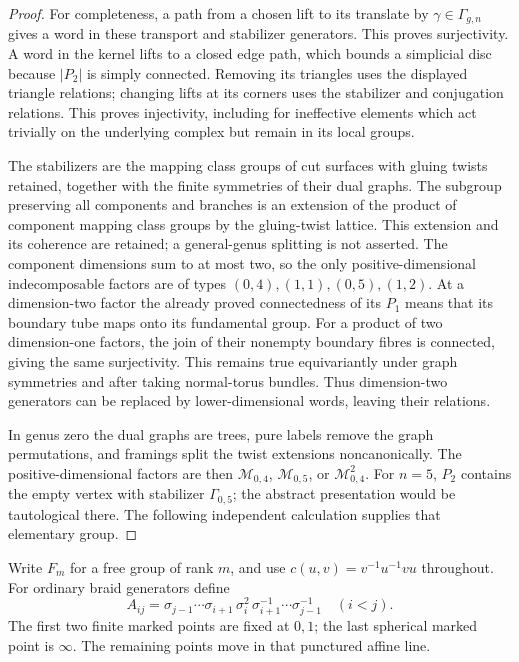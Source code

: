 \begin{proof}
For completeness, a path from a chosen lift to its
translate by \(\gamma\in\Gamma_{g,n}\) gives a word in
these transport and stabilizer generators. This proves
surjectivity. A word in the kernel lifts to a closed
edge path, which bounds a simplicial disc because
\(|P_2|\) is simply connected. Removing its triangles
uses the displayed triangle relations; changing lifts
at its corners uses the stabilizer and conjugation
relations. This proves injectivity, including for
ineffective elements which act trivially on the
underlying complex but remain in its local groups.

The stabilizers are the mapping class groups of cut
surfaces with gluing twists retained, together with
the finite symmetries of their dual graphs.
The subgroup preserving all components and branches
is an extension of the product of component mapping
class groups by the gluing-twist lattice.
This extension and its coherence are retained; a
general-genus splitting is not asserted.
The component dimensions sum to at most two, so the
only positive-dimensional indecomposable factors
are of types \((0,4),(1,1),(0,5),(1,2)\).
At a dimension-two factor the already proved
connectedness of its \(P_1\) means that its boundary
tube maps onto its fundamental group. For a product
of two dimension-one factors, the join of their
nonempty boundary fibres is connected, giving the
same surjectivity. This remains true equivariantly
under graph symmetries and after taking normal-torus
bundles. Thus dimension-two generators can be replaced
by lower-dimensional words, leaving their relations.

In genus zero the dual graphs are trees, pure labels
remove the graph permutations, and framings split the
twist extensions noncanonically. The positive-dimensional
factors are then \(\mathcal M_{0,4}\),
\(\mathcal M_{0,5}\), or \(\mathcal M_{0,4}^2\).
For \(n=5\), \(P_2\) contains the empty vertex with
stabilizer \(\Gamma_{0,5}\); the abstract presentation
would be tautological there. The following independent
calculation supplies that elementary group.
\end{proof}

Write \(F_m\) for a free group of rank \(m\), and use
\(c(u,v)=v^{-1}u^{-1}vu\) throughout.
For ordinary braid generators define
\[
 A_{ij}=\sigma_{j-1}\cdots\sigma_{i+1}\,
             \sigma_i^2\,\sigma_{i+1}^{-1}
                         \cdots\sigma_{j-1}^{-1}
                  \quad (i<j).
\]
The first two finite marked points are fixed at
\(0,1\); the last spherical marked point is \(\infty\).
The remaining points move in that punctured affine line.


